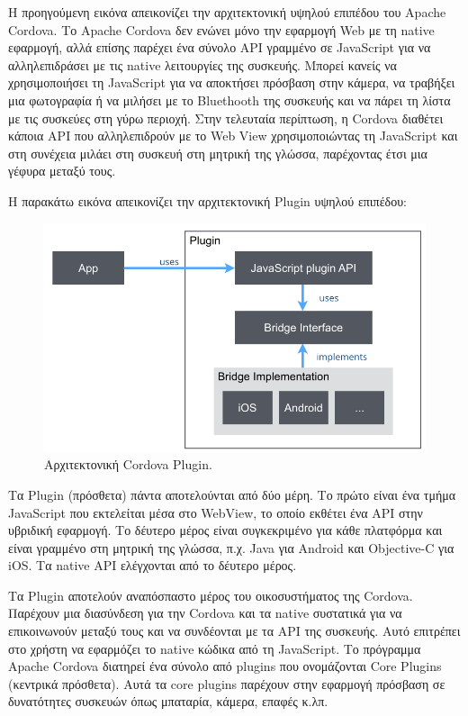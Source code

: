 \documentclass[a4paper,12pt]{article}
\begin{document}
			\newpage
			Η προηγούμενη εικόνα απεικονίζει την αρχιτεκτονική υψηλού επιπέδου του Apache Cordova. 
			Το Apache Cordova δεν ενώνει μόνο την εφαρμογή Web με τη native εφαρμογή, αλλά επίσης
			παρέχει ένα σύνολο API γραμμένο σε JavaScript για να αλληλεπιδράσει με τις native λειτουργίες της
			συσκευής. Μπορεί κανείς να χρησιμοποιήσει τη JavaScript για να αποκτήσει πρόσβαση στην κάμερα, να τραβήξει μια φωτογραφία ή να μιλήσει με το Bluethooth της
			συσκευής και να πάρει τη λίστα με τις συσκεύες στη γύρω περιοχή. Στην τελευταία περίπτωση, η Cordova διαθέτει κάποια API που αλληλεπιδρούν 
			με το Web View χρησιμοποιώντας τη JavaScript και στη συνέχεια μιλάει στη συσκευή στη μητρική της γλώσσα, παρέχοντας έτσι μια γέφυρα μεταξύ τους.
			
			Η παρακάτω εικόνα απεικονίζει την αρχιτεκτονική Plugin υψηλού επιπέδου:

			\begin{center}
				
			\end{center}
			\begin{figure}[!htb]
				\caption{Αρχιτεκτονική Cordova Plugin.}
				\vspace*{0.5cm}
				\centering
			\includegraphics[width=0.9\linewidth]{Cordova2} 			  
			\end{figure}
			
			\newpage
			Τα Plugin (πρόσθετα) πάντα αποτελούνται από δύο μέρη. Το πρώτο είναι ένα τμήμα JavaScript που εκτελείται μέσα στο WebView, το οποίο εκθέτει ένα API στην υβριδική εφαρμογή. 
			Το δέυτερο μέρος είναι συγκεκριμένο για κάθε πλατφόρμα και είναι γραμμένο στη μητρική της γλώσσα, π.χ. Java 
			για Android και Objective-C για iOS. Τα native API ελέγχονται από το δέυτερο μέρος.

			Τα Plugin αποτελούν αναπόσπαστο μέρος του οικοσυστήματος της Cordova. Παρέχουν μια διασύνδεση για την Cordova και τα native 
			συστατικά για να επικοινωνούν μεταξύ τους και να συνδέονται με τα API της συσκευής. Αυτό επιτρέπει στο χρήστη να εφαρμόζει το 
			native κώδικα από τη JavaScript. Το πρόγραμμα Apache Cordova διατηρεί ένα σύνολο από plugins που ονομάζονται Core Plugins (κεντρικά πρόσθετα). 
			Αυτά τα core plugins παρέχουν στην εφαρμογή πρόσβαση σε δυνατότητες συσκευών όπως μπαταρία, κάμερα, επαφές κ.λπ.
\end{document}
